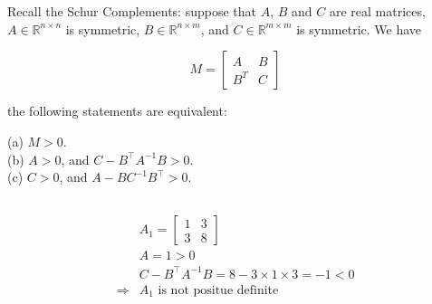 \documentclass{article}
\theoremstyle{definition} %
\newcommand{\RR}{\mathbb{R}}
\begin{document}
\section{}

Recall the Schur Complements: suppose that $A$, $B$ and $C$ are real matrices, $A\in \RR^{n\times n}$ is symmetric, $B\in \RR ^{n\times m}$, and $C\in \RR^{m\times m}$ is symmetric. We have

$$
M = 
\begin{bmatrix}
	A & B \\ B^T & C
\end{bmatrix}
$$

the following statements are equivalent:

(a) $M>0$.\\
(b) $A>0$, and $C-B^{\top} A^{-1} B>0$.\\
(c) $C>0$, and $A-B C^{-1} B^{\top}>0$.

\subsection{}

$$
\begin{aligned}
&A_1 =\left[\begin{array}{ll}
1 & 3 \\
3 & 8
\end{array}\right] \\
&A =1>0 \\
&C-B^{\top} A^{-1} B =8-3 \times 1 \times 3 = -1<0\\
\Rightarrow &A_1  \text{ is not positue definite}
\end{aligned}
$$
\end{document}
